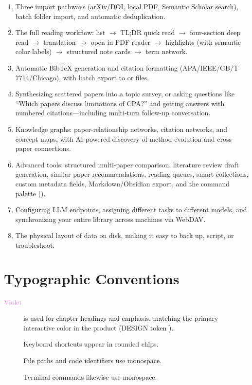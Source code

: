 \begin{enumerate}
  \item Three import pathways (arXiv/DOI, local PDF, Semantic Scholar search),
    batch folder import, and automatic deduplication.
  \item The full reading workflow: list $\to$ TL;DR quick read $\to$ four-section deep
    read $\to$ translation $\to$ open in PDF reader $\to$ highlights (with semantic
    color labels) $\to$ structured note cards $\to$ term network.
  \item Automatic BibTeX generation and citation formatting (APA/IEEE/GB/T 7714/Chicago),
    with batch export to  or  files.
  \item Synthesizing scattered papers into a topic survey, or asking questions like
    ``Which papers discuss limitations of CPA?'' and getting answers with numbered
    citations---including multi-turn follow-up conversation.
  \item Knowledge graphs: paper-relationship networks, citation networks, and concept
    maps, with AI-powered discovery of method evolution and cross-paper connections.
  \item Advanced tools: structured multi-paper comparison, literature review draft
    generation, similar-paper recommendations, reading queues, smart collections,
    custom metadata fields, Markdown/Obsidian export, and the command palette
    ().
  \item Configuring LLM endpoints, assigning different tasks to different models,
    and synchronizing your entire library across machines via WebDAV.
  \item The physical layout of data on disk, making it easy to back up, script, or
    troubleshoot.
\end{enumerate}

\section*{Typographic Conventions}

\begin{description}
  \item[\textcolor{violet}{Violet}] is used for chapter headings and emphasis,
    matching the primary interactive color in the product (DESIGN token ).
  \item[] Keyboard shortcuts appear in rounded chips.
  \item[] File paths and code identifiers use monospace.
  \item[] Terminal commands likewise use monospace.
\end{description}

